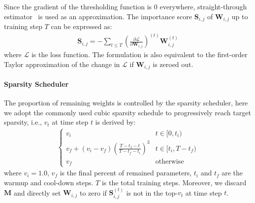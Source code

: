 Since the gradient of the thresholding function is 0 everywhere, straight-through estimator~\cite{st} is used as an approximation. The importance score $\bm{S}_{i,j}$ of $\bm{W}_{i,j}$ up to training step $T$ can be expressed as: 
\begin{align}
\bm{S}_{i,j}=-\sum_{t\le T}(\frac{\partial \mathcal{L}}{\partial \bm{W}_{i,j}})^{(t)} \bm{W}_{i,j}^{(t)}
\end{align}
where $\mathcal{L}$ is the loss function. The formulation is also equivalent to the first-order Taylor approximation of the change in $\mathcal{L}$ if $\bm{W}_{i,j}$ is zeroed out.

\paragraph{Sparsity Scheduler}
The proportion of remaining weights is controlled by the sparsity scheduler, here  we adopt the commonly used  cubic sparsity schedule to progressively reach target sparsity, i.e., $v_t$ at time step $t$ is derived by:
\begin{align}
	\begin{cases} 
		v_i & t\in [0, t_i) \\
		v_f+(v_i-v_f)(\frac{T-t_{f}-t}{T-t_f-t_i})^3 & t\in[t_i, T-t_f) \\
		v_f  & \text{otherwise}  
	\end{cases}
\end{align}
\label{eq:prune}
where $v_i=1.0$, $v_f$ is the final percent of remained parameters, $t_i$ and $t_f$ are the warmup and cool-down steps. $T$ is the total training steps. Moreover, we discard $\bm{M}$ and directly set $\bm{W}_{i,j}$ to zero if $\bm{S}_{i,j}^{(t)}$ is not in the top-$v_t$ at time step $t$. 
%

